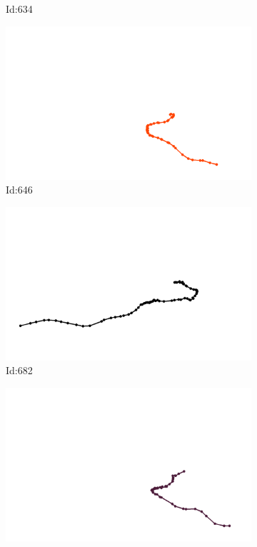 \documentclass[12pt,twoside]{report}
\begin{document}
\begin{figure}
\begin{subfigure}[b]{0.20\textwidth}
\caption{Id:634}
\end{subfigure}
\begin{subfigure}[b]{0.20\textwidth}
\centering
\includegraphics[width=\textwidth]{../trajectories/646.png}
\caption{Id:646}
\end{subfigure}
\begin{subfigure}[b]{0.20\textwidth}
\centering
\includegraphics[width=\textwidth]{../trajectories/682.png}
\caption{Id:682}
\end{subfigure}
\begin{subfigure}[b]{0.20\textwidth}
\centering
\includegraphics[width=\textwidth]{../trajectories/732.png}

\end{subfigure}
\end{figure}
\end{document}
